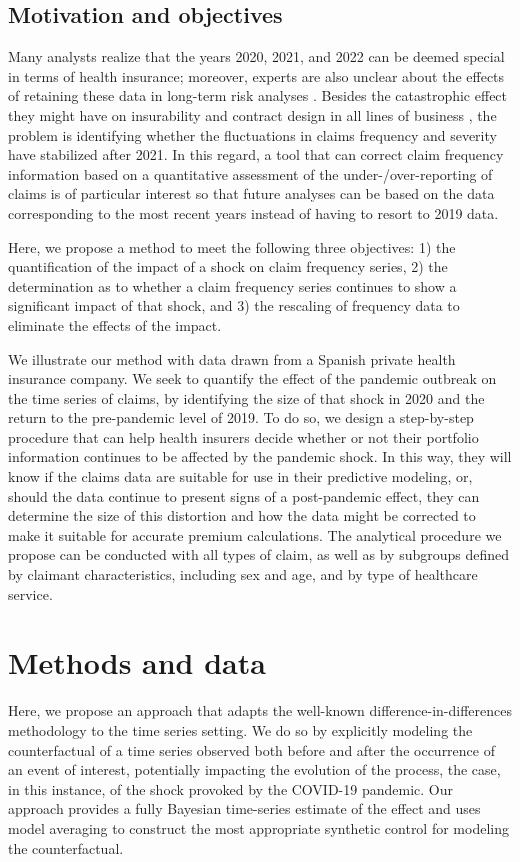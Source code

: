 \documentclass[]{risa}
\begin{document}
\subsection{Motivation and objectives}
Many analysts realize that the years 2020, 2021, and 2022 can be deemed special in terms of health insurance; moreover, experts are also unclear about the effects of retaining these data in long-term risk analyses \cite{biancalana2022quantitative}. Besides the catastrophic effect they might have on insurability and contract design in all lines of business \cite{hartwig2020insurance}, the problem is identifying whether the fluctuations in claims frequency and severity have stabilized after 2021. In this regard, a tool that can correct claim frequency information based on a quantitative assessment of the under-/over-reporting of claims is of particular interest so that future analyses can be based on the data corresponding to the most recent years instead of having to resort to 2019 data.

Here, we propose a method to meet the following three objectives: 1) the quantification of the impact of a shock on claim frequency series, 2) the determination as to whether a claim frequency series continues to show a significant impact of that shock, and 3) the rescaling of frequency data to eliminate the effects of the impact.

We illustrate our method with data drawn from a Spanish private health insurance company. We seek to quantify the effect of the pandemic outbreak on the time series of claims, by identifying the size of that shock in 2020 and the return to the pre-pandemic level of 2019. To do so, we design a step-by-step procedure that can help health insurers decide whether or not their portfolio information continues to be affected by the pandemic shock. In this way, they will know if the claims data are suitable for use in their predictive modeling, or, should the data continue to present signs of a post-pandemic effect, they can determine the size of this distortion and how the data might be corrected to make it suitable for accurate premium calculations. The analytical procedure we propose can be conducted with all types of claim, as well as by subgroups defined by claimant characteristics, including sex and age, and by type of healthcare service.



\section{Methods and data}\label{methods}
Here, we propose an approach that adapts the well-known difference-in-differences methodology to the time series setting. We do so by explicitly modeling the counterfactual of a time series observed both before and after the occurrence of an event of interest, potentially impacting the evolution of the process, the case, in this instance, of the shock provoked by the COVID-19 pandemic. Our approach provides a fully Bayesian time-series estimate of the effect and uses model averaging to construct the most appropriate synthetic control for modeling the counterfactual.
\end{document}
